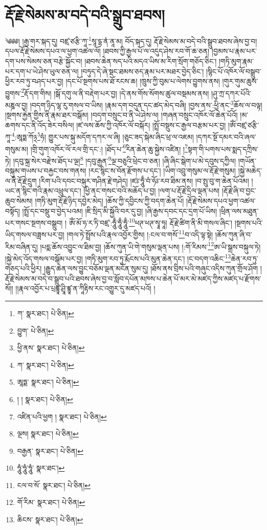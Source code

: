 \setcounter{footnote}{0} 
\chapter{རྡོ་རྗེ་སེམས་མ་བདེ་བའི་སྒྲུབ་ཐབས།}༄༅༅། །རྒྱ་གར་སྐད་དུ། བཛྲ་ཙརྩི་ཀཱ་\footnote{ཀ་  སྣར་ཐང་།  པེ་ཅིན། }སཱ་དྷ་ནཾ་ནཱ་མ། བོད་སྐད་དུ། རྡོ་རྗེ་སེམས་མ་བདེ་བའི་སྒྲུབ་ཐབས་ཞེས་བྱ་བ། དཔལ་རྡོ་རྗེ་སེམས་དཔའ་ལ་ཕྱག་འཚལ་ལོ། །ཐབས་ཀྱི་རྒྱལ་པོ་ལ་འདུད་ཤེས་རབ་གོ་ཆ་ཅན། །བྱམས་པ་རྣམ་པར་དག་པས་སེམས་ཅན་བརྩེ་སྐྱོང་བ། །ཐབས་ཆེན་སད་པའི་མདའ་ཡིས་མ་རིག་སྲོག་གཅོད་ཅིང་། །གཏི་མུག་རྣམ་པར་དག་པ་ཡེ་ཤེས་ཡུལ་ཅན་ལ། །བཏུད་དེ་ཞེ་སྡང་ཐམས་ཅད་རྣམ་པར་མཐར་བྱེད་ཅིང་། །སྙིང་པོ་འཁོར་ལོ་བསྒྲུབ་ཕྱིར་རབ་ཏུ་བཤད་པར་བྱ། །དང་པོ་སྔགས་པས་ཐོ་རངས་ཆ། །ཁྲུས་ཀྱི་བུམ་པ་ལེགས་བྱུགས་ནས། །གུར་གུམ་ཆུས་བྱུགས་\footnote{བྱུག་  པེ་ཅིན། }རྡོ་དག་གིས། །སྒོ་དགུ་ལ་ནི་བརྡེག་པར་བྱ། །དེ་ནས་གོས་སོགས་ཚུལ་བསྡམས་ནས། །ཤུ་ཀྲ་དཀར་པོའི་མཎྜལ་བྱ། །བདག་ཉིད་ལྷ་རུ་གསལ་བ་ཡིས། །རྣམ་དག་བདུན་དང་ཚད་མེད་བཞི། །བྱས་ནས་:ཕྱི་ནང་\footnote{ཕྱི་ནས་  སྣར་ཐང་།  པེ་ཅིན། }ཆོས་ལ་བལྟ། །སྔགས་རྐྱེན་གྱིས་ནི་རྣམ་ཐར་བསྒོམ། །བདག་བསྲུང་བ་ནི་ཡེ་ཤེས་ལ། །གཞན་བསྲུང་འཁོར་ལོ་ཆེན་པོའོ། །མ་ཆགས་དང་ནི་འོད་ཟེར་བསིལ། །ཛ་ལས་ཆོས་ཀྱི་འཁོར་ལོ་བསྐོར། །སྤྲོ་བསྡུས་ང་རྒྱལ་བརྩམ་པར་བྱ། །ཨོཾ་བཛྲ་ཙརྩི་ཀཱ་\footnote{ཀ་  སྣར་ཐང་།  པེ་ཅིན། }:ཨཱཏྨ་ཀོ྅\footnote{ཨཱཏྨ་  སྣར་ཐང་།  པེ་ཅིན། }ཧཾ། གྱུར་པས་སྐུ་མདོག་དཀར་ལ་ཞི། །ཅུང་ཟད་སྐེམ་ཞིང་ཕྲ་ལ་འཇམ། །དཀར་སྔོ་དམར་བའི་ཞལ་གསུམ་མ། །གྲི་གུག་འཁོར་ལོ་རལ་གྲི་དང་:། །ཐོད་པ་\footnote{། །  སྣར་ཐང་།  པེ་ཅིན། }རིན་ཆེན་ཆུ་སྐྱེས་འཛིན། །\footnote{འཛིན་པའི་ཕྱག །  སྣར་ཐང་།  པེ་ཅིན། }སྟག་གི་པགས་པས་སྨད་དཀྲིས་ཏེ། །དབུ་སྐྲ་སེར་བརྫེས་ཐོད་པ་ལྔ།\footnote{ལྔས།  སྣར་ཐང་།  པེ་ཅིན། } །དབུ་རྒྱན་\footnote{བརྒྱན་  སྣར་ཐང་།  པེ་ཅིན། }ལྔ་བཅུའི་ཕྲེང་བ་ཅན། །ཞི་ཞིང་སྒེག་པ་མེ་དབུས་དཀྱིལ། །གཡོན་བསྐུམ་གཡས་པ་བརྐྱང་བས་གནས། །རང་སྙིང་ས་བོན་རྫོགས་པ་དང་། །ཡིག་འབྲུ་གསུམ་ལ་རྡོ་རྗེ་གསུམ། །སྐྱེ་མཆེད་ལ་ནི་རྡོ་རྗེ་དྲུག །རིག་པའི་དབང་བསྐུར་གཤིན་རྗེ་གཤེད། །ཛཿ་ཧཱུྃ་བཾ་ཧོཿ་རབ་ཐིམ་ནས། །བ་སྤུ་བུ་ག་ཆེན་པོའམ། །ཡང་ན་སྙིང་གའི་རྣམ་འཕྲུལ་དང་། །ཕྱི་ནང་གསང་བའི་མཆོད་པ་བྱ། །ལག་པ་རྡོ་རྗེ་དྲིལ་ལྡན་པས། །རྡོ་རྗེ་ཞི་བ་བྱང་ཆུབ་སེམས། །གཏི་མུག་རྡོ་རྗེ་ཉིད་དབྱེར་མེད། །ཆོས་ཀྱི་དབྱིངས་ཀྱི་བདག་ཆེན་པོ། །རྡོ་རྗེ་སེམས་དཔའ་ཕྱག་འཚལ་བསྟོད། །སྤྲོ་དང་བསྡུ་བ་བྱེད་པའམ། །ཇི་སྲིད་མི་སྐྱོའི་བར་དུ་བྱ། །ཞི་རྒྱས་དབང་དང་དྲག་པོ་ཡིས། །ཕྲིན་ལས་མཐུན་པར་གསང་སྔགས་བསྒྲུབ། །
ཨོཾ་མོ་ཧ་ར་ཏི་བཛྲ་:ཧཱུྃ་ཧཱུྃ་ཧཱུྃ་\footnote{ཧཱུཾ་ཧཱུཾ་ཧཱུཾ་  སྣར་ཐང་། }ཕཊ་ཕཊ་སྭཱ་ཧཱ། རྡོ་རྗེ་ཚིག་ནི་མི་གསལ་ཞིང་། །སྔགས་པའི་ཡིད་གསལ་བཟླས་པར་བྱ། །གལ་ཏེ་སྤྲོས་པའི་རྣལ་འབྱོར་གྱིས། །:ངལ་བ་གསོ་\footnote{ངལ་བ་སོ་  སྣར་ཐང་།  པེ་ཅིན། }བ་འདི་ལྟ་སྟེ། །ཆོས་ཀུན་ཞི་བ་རིམ་བཞིན་དུ། །པདྨ་ཆོས་འབྱུང་ལ་ཐིམ་བྱ། །ཆོས་ཀུན་ཡི་གེ་གསུམ་ལྡན་པས། །:གོ་རིམས་\footnote{གོ་རིམ་  སྣར་ཐང་།  པེ་ཅིན། }ཨ་ཡི་སྒྲས་བསྐུལ་ཏེ། །སྐྱེ་མེད་འོད་གསལ་བསྒོམ་པར་བྱ། །གཏི་མུག་རབ་ཏུ་རྨོངས་པའི་མུན་ཆེན་དང་། །ང་བདག་འཆིང་\footnote{ཆིངས་  སྣར་ཐང་།  པེ་ཅིན། }ཆེན་རབ་ཏུ་གཅད་པའི་ཕྱིར། །རྒྱུད་ཆེན་ལས་བྱུང་བཅོམ་ལྡན་མངོན་སུམ་དུ། །ཐོས་ནས་བྲིས་པའི་གཞུང་འདིས་ཀུན་གྲོལ་ཤོག །རྡོ་རྗེ་སེམས་མ་བདེ་བ་སྒྲུབ་པའི་ཐབས་ཞེས་བྱ་བ་སློབ་དཔོན་མཁས་པ་ཆེན་པོ་མར་མེ་མཛད་ཀྱིས་མཛད་པ་རྫོགས་སོ།། །།རྣལ་འབྱོར་པ་པྲཛྙཱ་ཤྲཱི་ཛྙཱ་ན་ཀཱིརྟིས་རང་འགྱུར་དུ་མཛད་པའོ། ། 